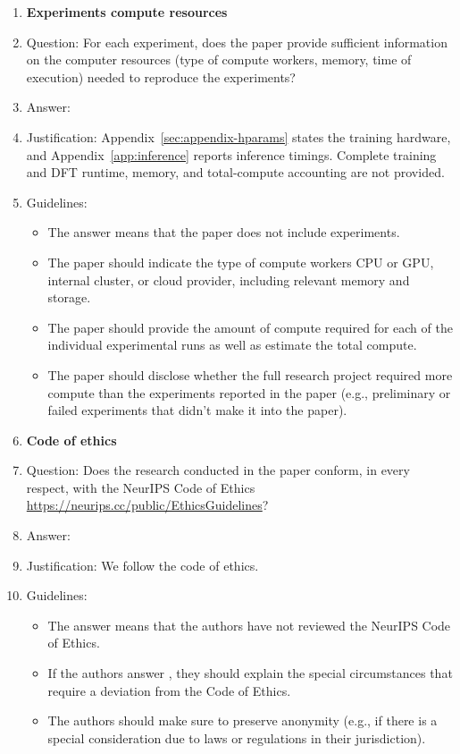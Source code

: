 \documentclass{article}
\theoremstyle{plain}
\theoremstyle{definition}
\theoremstyle{remark}
\begin{document}
\begin{enumerate}
\item {\bf Experiments compute resources}
    \item[] Question: For each experiment, does the paper provide sufficient information on the computer resources (type of compute workers, memory, time of execution) needed to reproduce the experiments?
    \item[] Answer: \answerNo{} %
    \item[] Justification: Appendix~\ref{sec:appendix-hparams} states the training hardware, and Appendix~\ref{app:inference} reports inference timings. Complete training and DFT runtime, memory, and total-compute accounting are not provided.
    \item[] Guidelines:
    \begin{itemize}
        \item The answer \answerNA{} means that the paper does not include experiments.
        \item The paper should indicate the type of compute workers CPU or GPU, internal cluster, or cloud provider, including relevant memory and storage.
        \item The paper should provide the amount of compute required for each of the individual experimental runs as well as estimate the total compute. 
        \item The paper should disclose whether the full research project required more compute than the experiments reported in the paper (e.g., preliminary or failed experiments that didn't make it into the paper). 
    \end{itemize}
    
\item {\bf Code of ethics}
    \item[] Question: Does the research conducted in the paper conform, in every respect, with the NeurIPS Code of Ethics \url{https://neurips.cc/public/EthicsGuidelines}?
    \item[] Answer: \answerYes{} %
    \item[] Justification: We follow the code of ethics.
    \item[] Guidelines:
    \begin{itemize}
        \item The answer \answerNA{} means that the authors have not reviewed the NeurIPS Code of Ethics.
        \item If the authors answer \answerNo, they should explain the special circumstances that require a deviation from the Code of Ethics.
        \item The authors should make sure to preserve anonymity (e.g., if there is a special consideration due to laws or regulations in their jurisdiction).
    \end{itemize}



\end{enumerate}
\end{document}

